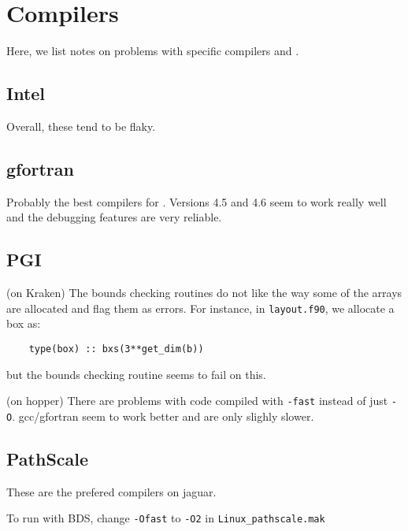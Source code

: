 \section{Compilers}

Here, we list notes on problems with specific compilers and \maestro.

\subsection{Intel}

Overall, these tend to be flaky. 

\subsection{gfortran}

Probably the best compilers for \maestro.  Versions 4.5 and 4.6 seem to work
really well and the debugging features are very reliable.


\subsection{PGI}

(on Kraken) The bounds checking routines do not like the way some of
the arrays are allocated and flag them as errors.  For instance, in
{\tt layout.f90}, we allocate a box as:
\begin{verbatim}
    type(box) :: bxs(3**get_dim(b))
\end{verbatim}
but the bounds checking routine seems to fail on this.

(on hopper) There are problems with code compiled with {\tt -fast}
instead of just {\tt -O}.  gcc/gfortran seem to work better and 
are only slighly slower.


\subsection{PathScale}

These are the prefered compilers on jaguar.

To run with BDS, change {\tt -Ofast} to {\tt -O2} in {\tt Linux\_pathscale.mak}
